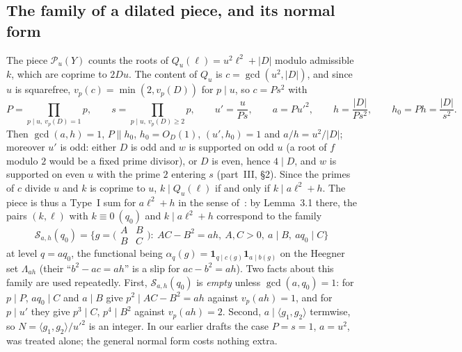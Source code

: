 \documentclass[11pt,a4paper]{article}
\begin{document}
\subsection{The family of a dilated piece, and its normal form}\label{sec:normal}
The piece $\mathcal P_u(Y)$ counts the roots of $Q_u(\ell)=u^2\ell^2+|D|$ modulo admissible $k$, which are coprime to $2Du$. The content of $Q_u$ is $c=\gcd(u^2,|D|)$, and since
$u$ is squarefree, $v_p(c)=\min(2,v_p(D))$ for $p\mid u$, so $c=Ps^2$ with
\[
P=\prod_{p\mid u,\ v_p(D)=1}p,\qquad s=\prod_{p\mid u,\ v_p(D)\ge2}p,\qquad u'=\frac u{Ps},\qquad a=Pu'^2,\qquad h=\frac{|D|}{Ps^2},\qquad h_0=Ph=\frac{|D|}{s^2}.
\]
Then $\gcd(a,h)=1$, $P\parallel h_0$, $h_0=O_D(1)$, $(u',h_0)=1$ and $a/h=u^2/|D|$; moreover $u'$ is odd: either $D$ is odd and $w$ is supported on odd $u$ (a root of $f$ modulo $2$
would be a fixed prime divisor), or $D$ is even, hence $4\mid D$, and $w$ is supported on even $u$ with the prime $2$ entering $s$ (part~III, \S2). Since the primes of $c$ divide $u$
and $k$ is coprime to $u$, $k\mid Q_u(\ell)$ if and only if $k\mid a\ell^2+h$. The piece is thus a Type~I sum for $a\ell^2+h$ in the sense of~\cite{GrimmeltMerikoski2025quadratic}:
by Lemma~3.1 there, the pairs $(k,\ell)$ with $k\equiv0\ (q_0)$ and $k\mid a\ell^2+h$ correspond to the family
\[
\mathcal S_{a,h}(q_0)=\bigl\{g=\bigl(\begin{smallmatrix}A&B\\B&C\end{smallmatrix}\bigr):\ AC-B^2=ah,\ A,C>0,\ a\mid B,\ aq_0\mid C\bigr\}
\]
at level $q=aq_0$, the functional being $\alpha_q(g)=\mathbf 1_{q\mid c(g)}\mathbf 1_{a\mid b(g)}$ on the Heegner set $\Lambda_{ah}$ (their ``$b^2-ac=ah$'' is a slip for $ac-b^2=ah$).
Two facts about this family are used repeatedly. First, $\mathcal S_{a,h}(q_0)$ is \emph{empty} unless $\gcd(a,q_0)=1$: for $p\mid P$, $aq_0\mid C$ and $a\mid B$ give $p^2\mid AC-B^2=ah$
against $v_p(ah)=1$, and for $p\mid u'$ they give $p^3\mid C$, $p^4\mid B^2$ against $v_p(ah)=2$. Second, $a\mid\langle g_1,g_2\rangle$ termwise, so $N=\langle g_1,g_2\rangle/u'^2$
is an integer. In our earlier drafts the case $P=s=1$, $a=u^2$, was treated alone; the general normal form costs nothing extra.
\end{document}
